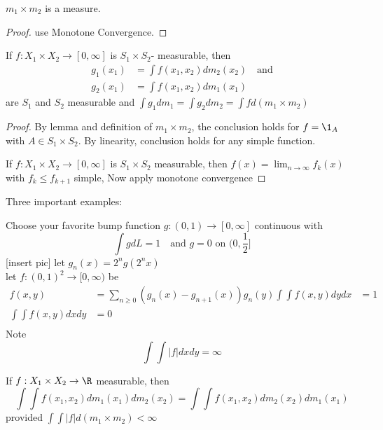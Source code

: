 \begin{theorem}
	$m_1 \times m_2$ is a measure.
\end{theorem}

\begin{proof}
	use Monotone Convergence.
\end{proof}

\begin{theorem}[Fubini]
	If $f:X_1 \times X_2 \to [0, \infty]$ is  $S_1 \times S_2$- measurable, then
	\begin{align*}
		g_1 (x_1) &= \int f(x_1, x_2) dm_2(x_2) \quad \text{and} \\
		g_2 (x_1) &= \int f(x_1, x_2) dm_1(x_1)
	\end{align*} 
	are $S_1$ and $S_2$ measurable and $\int g_1 dm_1 = \int g_2 dm_2 = \int f d(m_1 \times m_2)$
\end{theorem}

\begin{proof}
	By lemma and definition of $m_1 \times m_2$, the conclusion holds for $f = \1_A$ with $A \in S_{1} \times S_2$.
	By linearity, conclusion holds for any simple function.

	If $f: X_1 \times X_2 \to [0,\infty]$ is  $S_1 \times S_2$ measurable, then $f(x) = \lim_{n\to \infty}f_k (x)$
	with $f_k \leq f_{k+1}$ simple, Now apply monotone convergence
\end{proof}

Three important examples:

\begin{example}[Example 1] Choose your favorite bump function $g: (0,1) \to [0,\infty]$ continuous with 
	\[
		\int g dL = 1 \quad \text{and } g = 0 \text{ on } (0, \frac{1}{2}]
	\]  
	[insert pic]
	let $g_n(x) = 2^n g(2^nx)$ \\
	let $f:(0,1)^2 \to [0,\infty)	$ be
	\begin{align*}
		f(x,y) &= \sum_{n \geq 0} (g_n (x) - g_{n+1}(x)) g_n(y)
		\int \int f(x,y) dy dx &= 1 \\
		\int \int f(x,y) dx dy &= 0 \\
	\end{align*} 
	Note
	\[
		\int \int |f| dx dy = \infty
	\] 
\end{example}

\begin{corollary}
	If $f: X_1 \times X_2 \to \R$ measurable, then
	\[
		\int \int f(x_1, x_2) dm_1 (x_1) dm_2 (x_2) = \int \int f(x_1, x_2) dm_2(x_2) dm_1(x_1)
	\] 
	provided $\int \int |f| d(m_1 \times m_2) < \infty$
\end{corollary}

